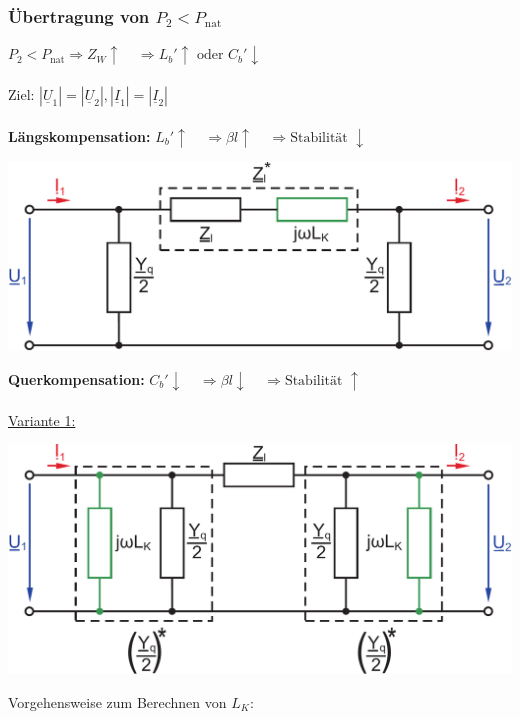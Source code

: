 \documentclass[a4paper,twocolumn,10pt]{article}
\begin{document}
\subsubsection{Übertragung von $P_2<P_{\text{nat}}$}
$P_2<P_{\text{nat}}\Rightarrow Z_W\uparrow\;\;\;\;\Rightarrow L_b'\uparrow\text{ oder }C_b'\downarrow$\\\\
Ziel: $|\underline{U}_1|=|\underline{U}_2|,|\underline{I}_1|=|\underline{I}_2|$\\\\
\textbf{Längskompensation:} $L_b'\uparrow\;\;\;\;\Rightarrow\beta l\uparrow\;\;\;\;\Rightarrow\text{Stabilität }\downarrow$
\begin{center}
\includegraphics[width=0.98\columnwidth]{Grafiken/Laengskompensation_1}
\end{center}
\vspace{0.3cm}
\textbf{Querkompensation:} $C_b'\downarrow\;\;\;\;\Rightarrow\beta l\downarrow\;\;\;\;\Rightarrow\text{Stabilität }\uparrow$\\\\
\underline{Variante 1:}
\begin{center}
\includegraphics[width=0.98\columnwidth]{Grafiken/Querkompensation_1}
\end{center}
Vorgehensweise zum Berechnen von $L_K$:
\end{document}
